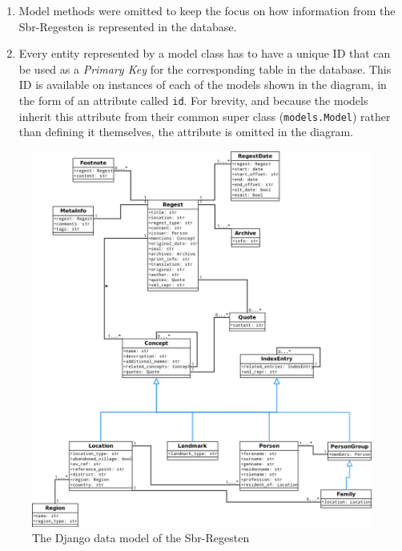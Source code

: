 \begin{enumerate}
\item Model methods were omitted to keep the focus on how information
  from the Sbr-Regesten is represented in the database.
\item Every entity represented by a model class has to have a unique
  ID that can be used as a \emph{Primary Key} for the corresponding
  table in the database. This ID is available on instances of each of
  the models shown in the diagram, in the form of an attribute called
  \texttt{id}. For brevity, and because the models inherit this
  attribute from their common super class (\texttt{models.Model})
  rather than defining it themselves, the attribute is omitted in the
  diagram.
\end{enumerate}

\begin{figure}[h]
  \centering
  \includegraphics[scale=0.4]{img/data-model}
  \caption{The Django data model of the Sbr-Regesten}
  \label{fig:data-model}
\end{figure}

